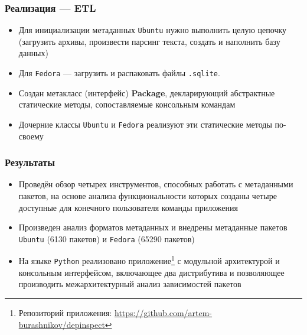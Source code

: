 \documentclass{beamer}
\begin{document}


\begin{frame}[t]
	\frametitle{Реализация --- ETL}
	\begin{itemize}
		\item Для инициализации метаданных \texttt{Ubuntu} нужно выполнить целую цепочку (загрузить архивы, произвести парсинг текста, создать и наполнить базу данных)
		\item Для \texttt{Fedora} --- загрузить и распаковать файлы \texttt{.sqlite}.
	\end{itemize}

	\begin{itemize}
		\item Создан метакласс (интерфейс) \textbf{Package}, декларирующий абстрактные статические методы, сопоставляемые консольным командам
		\item Дочерние классы \texttt{Ubuntu} и \texttt{Fedora} реализуют эти статические методы по-своему
	\end{itemize}
\end{frame}

\begin{frame}
	\frametitle{Результаты}
	\begin{itemize}
		\item Проведён обзор четырех инструментов, способных работать с метаданными пакетов, на основе анализа функциональности которых созданы четыре доступные для конечного пользователя команды приложения
		\item Произведен анализ форматов метаданных и внедрены метаданные пакетов \texttt{Ubuntu} (6130 пакетов) и \texttt{Fedora} (65290 пакетов)
		\item На языке \texttt{Python} реализовано приложение\footnote{Репозиторий приложения: \href{https://github.com/artem-burashnikov/depinspect}{https://github.com/artem-burashnikov/depinspect}} с модульной архитектурой и консольным интерфейсом, включающее два дистрибутива и позволяющее производить межархитектурный анализ зависимостей пакетов
	\end{itemize}
\end{frame}


% 		
\end{document}
